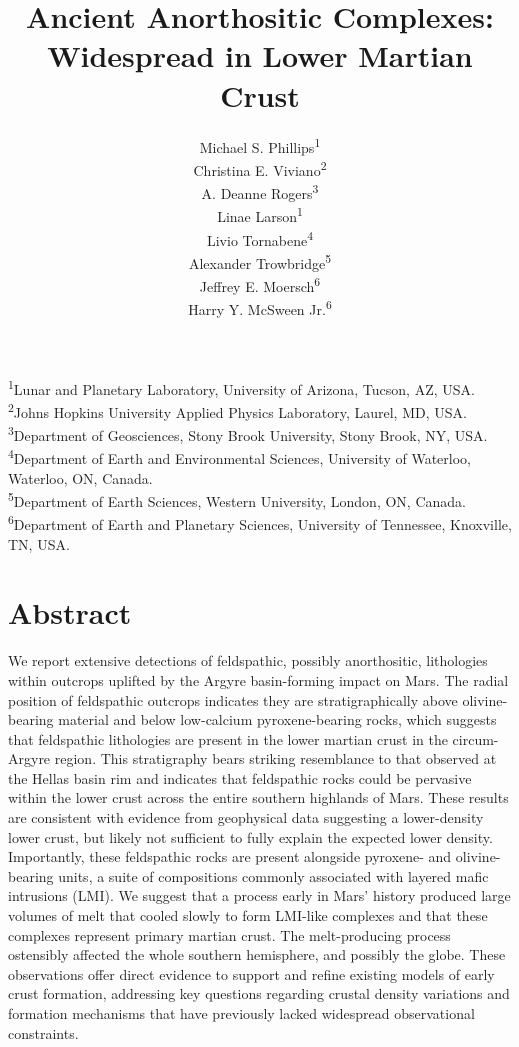 \documentclass[12pt]{article}
\title{\textbf{Ancient Anorthositic Complexes: Widespread in Lower Martian Crust}}
\author{Michael S. Phillips\textsuperscript{1}\\ 
Christina E. Viviano\textsuperscript{2}\\
A. Deanne Rogers\textsuperscript{3}\\
Linae Larson\textsuperscript{1}\\
Livio Tornabene\textsuperscript{4}\\
Alexander Trowbridge\textsuperscript{5}\\
Jeffrey E. Moersch\textsuperscript{6}\\
Harry Y. McSween Jr.\textsuperscript{6}}
\begin{document}
\maketitle

\begin{flushleft}
\textsuperscript{1}Lunar and Planetary Laboratory, University of Arizona, Tucson, AZ, USA.\\
\textsuperscript{2}Johns Hopkins University Applied Physics Laboratory, Laurel, MD, USA.\\
\textsuperscript{3}Department of Geosciences, Stony Brook University, Stony Brook, NY, USA.\\
\textsuperscript{4}Department of Earth and Environmental Sciences, University of Waterloo, Waterloo, ON, Canada.\\
\textsuperscript{5}Department of Earth Sciences, Western University, London, ON, Canada.\\
\textsuperscript{6}Department of Earth and Planetary Sciences, University of Tennessee, Knoxville, TN, USA.\\
\end{flushleft}

\newpage
\section*{Abstract}
\setlength{\parindent}{0em} %
\setlength{\parskip}{6pt}   %
We report extensive detections of feldspathic, possibly anorthositic, lithologies within outcrops uplifted by the Argyre basin-forming impact on Mars. The radial position of feldspathic outcrops indicates they are stratigraphically above olivine-bearing material and below low-calcium pyroxene-bearing rocks, which suggests that feldspathic lithologies are present in the lower martian crust in the circum-Argyre region. This stratigraphy bears striking resemblance to that observed at the Hellas basin rim and indicates that feldspathic rocks could be pervasive within the lower crust across the entire southern highlands of Mars. These results are consistent with evidence from geophysical data suggesting a lower-density lower crust, but likely not sufficient to fully explain the expected lower density. Importantly, these feldspathic rocks are present alongside pyroxene- and olivine-bearing units, a suite of compositions commonly associated with layered mafic intrusions (LMI). We suggest that a process early in Mars' history produced large volumes of melt that cooled slowly to form LMI-like complexes and that these complexes represent primary martian crust. The melt-producing process ostensibly affected the whole southern hemisphere, and possibly the globe. These observations offer direct evidence to support and refine existing models of early crust formation, addressing key questions regarding crustal density variations and formation mechanisms that have previously lacked widespread observational constraints.
\end{document}
